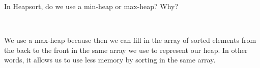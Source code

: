 \question In Heapsort, do we use a min-heap or max-heap? Why?

\\

\begin{solution}[0.75in]
We use a max-heap because then we can fill in the array of sorted elements from the back to the front in the same array we use to represent our heap. In other words, it allows us to use less memory by sorting in the same array. 
\end{solution}